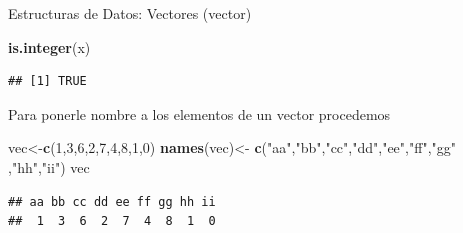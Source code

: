 \documentclass[ignorenonframetext,]{beamer}
\newenvironment{Shaded}{\begin{snugshade}}{\end{snugshade}}
\newcommand{\KeywordTok}[1]{\textcolor[rgb]{0.13,0.29,0.53}{\textbf{#1}}}
\newcommand{\DecValTok}[1]{\textcolor[rgb]{0.00,0.00,0.81}{#1}}
\newcommand{\StringTok}[1]{\textcolor[rgb]{0.31,0.60,0.02}{#1}}
\newcommand{\NormalTok}[1]{#1}
\begin{document}
\begin{frame}[fragile]{Estructuras de Datos: Vectores (vector)}

\begin{Shaded}
\begin{Highlighting}[]
\KeywordTok{is.integer}\NormalTok{(x)}
\end{Highlighting}
\end{Shaded}

\begin{verbatim}
## [1] TRUE
\end{verbatim}

Para ponerle nombre a los elementos de un vector procedemos

\begin{Shaded}
\begin{Highlighting}[]
\NormalTok{vec<-}\KeywordTok{c}\NormalTok{(}\DecValTok{1}\NormalTok{,}\DecValTok{3}\NormalTok{,}\DecValTok{6}\NormalTok{,}\DecValTok{2}\NormalTok{,}\DecValTok{7}\NormalTok{,}\DecValTok{4}\NormalTok{,}\DecValTok{8}\NormalTok{,}\DecValTok{1}\NormalTok{,}\DecValTok{0}\NormalTok{)}
\KeywordTok{names}\NormalTok{(vec)<-}\StringTok{ }\KeywordTok{c}\NormalTok{(}\StringTok{"aa"}\NormalTok{,}\StringTok{"bb"}\NormalTok{,}\StringTok{"cc"}\NormalTok{,}\StringTok{"dd"}\NormalTok{,}\StringTok{"ee"}\NormalTok{,}\StringTok{"ff"}\NormalTok{,}\StringTok{"gg"}
\NormalTok{               ,}\StringTok{"hh"}\NormalTok{,}\StringTok{"ii"}\NormalTok{)}
\NormalTok{vec}
\end{Highlighting}
\end{Shaded}

\begin{verbatim}
## aa bb cc dd ee ff gg hh ii 
##  1  3  6  2  7  4  8  1  0
\end{verbatim}

\end{frame}
\end{document}

